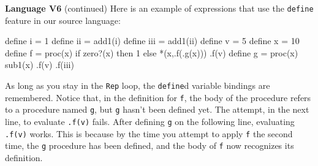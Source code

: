 \begin{minipage}[t]{\sw}
\slidenumber
\LARGE
{\bf Language V6} (continued)\exx
Here is an example of expressions
that use the \verb'define' feature
in our source language:
\Large
\begin{qv}
define i = 1
define ii = add1(i)
define iii = add1(ii)
define v = 5
define x = 10
define f = proc(x) if zero?(x) then 1 else *(x,.f(.g(x)))
.f(v)   %
define g = proc(x) sub1(x)
.f(v)   %
.f(iii) %
\end{qv}
\LARGE
As long as you stay in the \verb'Rep' loop,
the \verb'define'd variable bindings are remembered.\exx
Notice that, in the definition for \verb'f',
the body of the procedure refers to a procedure named \verb'g',
but \verb'g' hasn't been defined yet.
The attempt, in the next line, to evaluate \verb'.f(v)' fails.
After defining \verb'g' on the following line,
evaluating \verb'.f(v)' works.
This is because
by the time you attempt to apply \verb'f' the second time,
the \verb'g' procedure has been defined,
and the body of \verb'f' now recognizes its definition.
\end{minipage}
\clearpage
